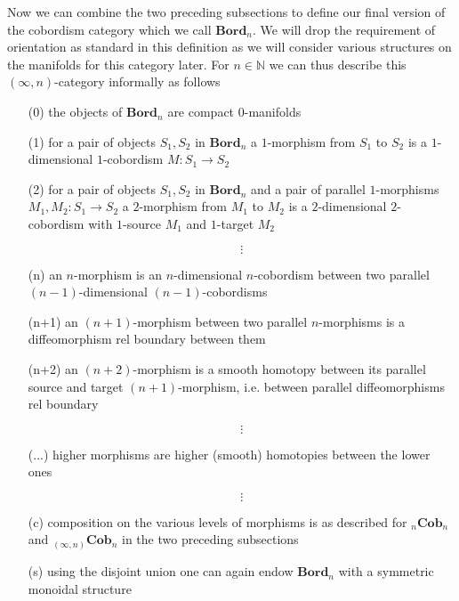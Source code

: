 Now we can combine the two preceding subsections to define our final version of the cobordism category which we call $\mathbf{Bord}_{n}$. We will drop the requirement of orientation as standard in this definition as we will consider various structures on the manifolds for this category later. For $n \in \mathbb{N}$ we can thus describe this $(\infty,n)$-category informally as follows
\begin{enumerate}
\item[(0)]
the objects of $\mathbf{Bord}_{n}$ are compact $0$-manifolds

\item[(1)]
for a pair of objects $S_{1},S_{2}$ in $\mathbf{Bord}_{n}$ a $1$-morphism from $S_{1}$ to $S_{2}$ is a $1$-dimensional $1$-cobordism $M \colon S_{1} \to S_{2}$

\item[(2)]
for a pair of objects $S_{1},S_{2}$ in $\mathbf{Bord}_{n}$ and a pair of parallel $1$-morphisms $M_{1},M_{2} \colon S_{1} \to S_{2}$ a $2$-morphism from $M_{1}$ to $M_{2}$ is a $2$-dimensional $2$-cobordism with $1$-source $M_{1}$ and $1$-target $M_{2}$

\item[]
\begin{equation*}
\vdots
\end{equation*}
\item[]

\item[(n)]
an $n$-morphism is an $n$-dimensional $n$-cobordism between two parallel $(n-1)$-dimensional $(n-1)$-cobordisms

\item[(n+1)]
an $(n+1)$-morphism between two parallel $n$-morphisms is a diffeomorphism rel boundary between them

\item[(n+2)]
an $(n+2)$-morphism is a smooth homotopy between its parallel source and target $(n+1)$-morphism, i.e. between parallel diffeomorphisms rel boundary

\item[]
\begin{equation*}
\vdots
\end{equation*}
\item[]

\item[(...)]
higher morphisms are higher (smooth) homotopies between the lower ones

\item[]
\begin{equation*}
\vdots
\end{equation*}
\item[]

\item[(c)]
composition on the various levels of morphisms is as described for ${_{n}}\mathbf{Cob}_{n}$ and ${_{(\infty,n)}}\mathbf{Cob}_{n}$ in the two preceding subsections

\item[(s)]
using the disjoint union one can again endow $\mathbf{Bord}_{n}$ with a symmetric monoidal structure
\end{enumerate}
